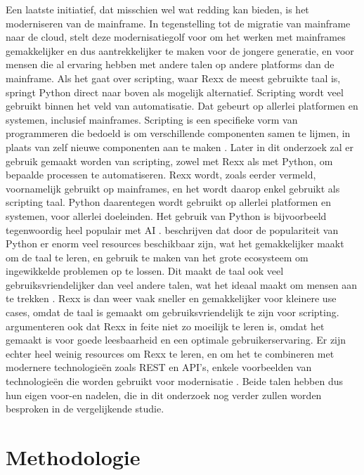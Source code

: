 Een laatste initiatief, dat misschien wel wat redding kan bieden, is het moderniseren van de mainframe. In tegenstelling tot de migratie van mainframe naar de cloud, stelt deze modernisatiegolf voor om het werken met mainframes gemakkelijker en dus aantrekkelijker te maken voor de jongere generatie, en voor mensen die al ervaring hebben met andere talen op andere platforms dan de mainframe. Als het gaat over scripting, waar Rexx de meest gebruikte taal is, springt Python direct naar boven als mogelijk alternatief. Scripting wordt veel gebruikt binnen het veld van automatisatie. Dat gebeurt op allerlei platformen en systemen, inclusief mainframes. Scripting is een specifieke vorm van programmeren die bedoeld is om verschillende componenten samen te lijmen, in plaats van zelf nieuwe componenten aan te maken \autocite{Ousterhout1998}. Later in dit onderzoek zal er gebruik gemaakt worden van scripting, zowel met Rexx als met Python, om bepaalde processen te automatiseren. Rexx wordt, zoals eerder vermeld, voornamelijk gebruikt op mainframes, en het wordt daarop enkel gebruikt als scripting taal. Python daarentegen wordt gebruikt op allerlei platformen en systemen, voor allerlei doeleinden. Het gebruik van Python is bijvoorbeeld tegenwoordig heel populair met AI \autocite{Sadavarte2022}. \textcite{Sadavarte2022} beschrijven dat door de populariteit van Python er enorm veel resources beschikbaar zijn, wat het gemakkelijker maakt om de taal te leren, en gebruik te maken van het grote ecosysteem om ingewikkelde problemen op te lossen. Dit maakt de taal ook veel gebruiksvriendelijker dan veel andere talen, wat het ideaal maakt om mensen aan te trekken \autocite{Sanglier2022}. Rexx is dan weer vaak sneller en gemakkelijker voor kleinere use cases, omdat de taal is gemaakt om gebruiksvriendelijk te zijn voor scripting. \textcite{Winkler2023} argumenteren ook dat Rexx in feite niet zo moeilijk te leren is, omdat het gemaakt is voor goede leesbaarheid en een optimale gebruikerservaring. Er zijn echter heel weinig resources om Rexx te leren, en om het te combineren met modernere technologieën zoals REST en API’s, enkele voorbeelden van technologieën die worden gebruikt voor modernisatie \autocite{Sadavarte2022}. Beide talen hebben dus hun eigen voor-en nadelen, die in dit onderzoek nog verder zullen worden besproken in de vergelijkende studie.


\section{Methodologie}%
\label{sec:methodologie}

